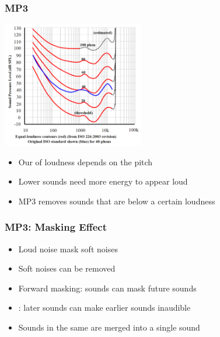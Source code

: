 \documentclass{../ucll-slides}
\begin{document}
\begin{frame}
  \frametitle{MP3}
  \begin{center}
    \includegraphics[height=5.5cm]{isophones.png}
  \end{center}
  \begin{itemize}
    \item Our  of loudness depends on the pitch
    \item Lower sounds need more energy to appear loud
    \item MP3 removes sounds that are below a certain loudness
  \end{itemize}
\end{frame}

\begin{frame}
  \frametitle{MP3: Masking Effect}
  \begin{itemize}
    \item Loud noise mask soft noises
    \item Soft noises can be removed
    \item Forward masking: sounds can mask future sounds
    \item {}: later sounds can make earlier sounds inaudible
    \item Sounds in the same  are merged into a single sound
  \end{itemize}
\end{frame}
\end{document}
